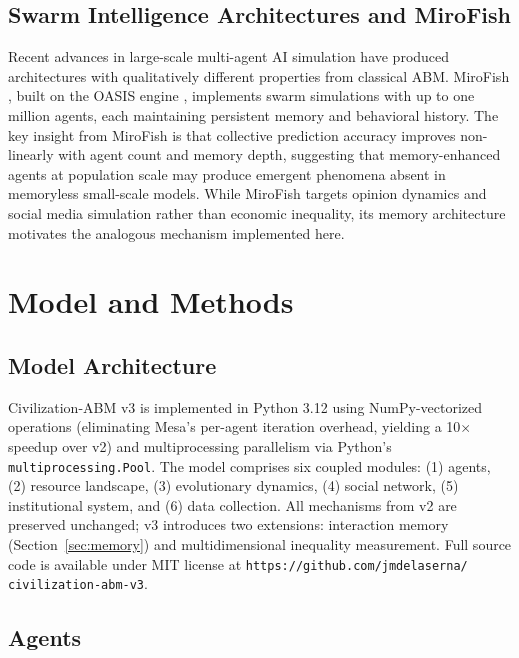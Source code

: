 \documentclass[12pt, letterpaper]{article}
\begin{document}
\subsection{Swarm Intelligence Architectures and MiroFish}

Recent advances in large-scale multi-agent AI simulation have produced
architectures with qualitatively different properties from classical
ABM. MiroFish \citep{mirofish2025}, built on the OASIS engine
\citep{yang2024oasis}, implements swarm simulations with up to one
million agents, each maintaining persistent memory and behavioral
history. The key insight from MiroFish is that collective prediction
accuracy improves non-linearly with agent count and memory depth,
suggesting that memory-enhanced agents at population scale may produce
emergent phenomena absent in memoryless small-scale models. While
MiroFish targets opinion dynamics and social media simulation rather
than economic inequality, its memory architecture motivates the
analogous mechanism implemented here.


\section{Model and Methods}

\subsection{Model Architecture}

Civilization-ABM v3 is implemented in Python 3.12 using NumPy-vectorized
operations (eliminating Mesa's per-agent iteration overhead, yielding a
10$\times$ speedup over v2) and multiprocessing parallelism via Python's
\texttt{multiprocessing.Pool}. The model comprises six coupled modules:
(1) agents, (2) resource landscape, (3) evolutionary dynamics,
(4) social network, (5) institutional system, and (6) data collection.
All mechanisms from v2 are preserved unchanged; v3 introduces two
extensions: interaction memory (Section~\ref{sec:memory}) and
multidimensional inequality measurement. Full source code is available
under MIT license at \texttt{https://github.com/jmdelaserna/
civilization-abm-v3}.

\subsection{Agents}
\end{document}
